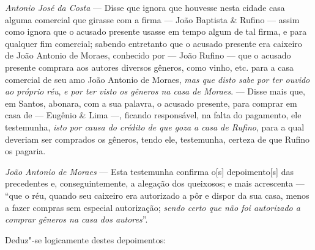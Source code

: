 \noindent\emph{Antonio José da Costa} --- Disse que ignora que houvesse nesta
cidade casa alguma comercial que girasse com a firma --- João Baptista \&
Rufino --- assim como ignora que o acusado presente usasse em tempo algum
de tal firma, e para qualquer fim comercial; sabendo entretanto que o
acusado presente era caixeiro de João Antonio de Moraes, conhecido por ---
João Rufino --- que o acusado presente comprara aos autores diversos
gêneros, como vinho, etc. para a casa comercial de seu amo João Antonio
de Moraes, \emph{mas que disto sabe por ter ouvido ao próprio réu},
\emph{e por ter visto os gêneros na casa de Moraes}. --- Disse mais que,
em Santos, abonara, com a sua palavra, o acusado presente, para comprar
em casa de --- Eugênio \& Lima ---, ficando responsável, na falta do
pagamento, ele testemunha, \emph{isto por causa do crédito de que goza a
casa de Rufino}, para a qual deveriam ser comprados os gêneros, tendo
ele, testemunha, certeza de que Rufino os pagaria.\medskip

\noindent\emph{João Antonio de Moraes} --- Esta testemunha confirma o{[}s{]}
depoimento{[}s{]} das precedentes e, conseguintemente, a alegação dos
queixosos; e mais acrescenta --- ``que o réu, quando seu caixeiro era
autorizado a pôr e dispor da sua casa, menos a fazer compras sem
especial autorização; \emph{sendo certo que não foi autorizado a comprar
gêneros na casa dos autores}''.

\asterisc

Deduz"-se logicamente destes depoimentos:

